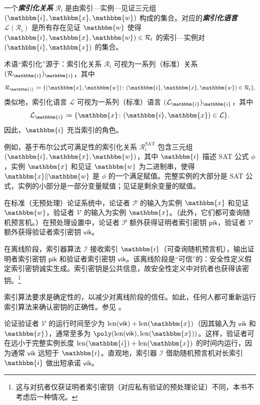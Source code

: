 \documentclass[american,singlepageview]{snargs-book-zh}
\newcommand{\defemph}[1]{\textbf{\emph{#1}}}
\newcommand{\DefineEqual}{\coloneqq}
\newcommand{\concat}{\|}
\newcommand{\BitSize}[1]{\mathrm{len}(#1)}
\newcommand{\Relation}{\mathcal{R}}
\newcommand{\Language}{\mathcal{L}}
\newcommand{\GetLanguage}[1]{\Language(#1)}
\newcommand{\IndexedRelation}{\mathcal{R}_{\mathrm{i}}}
\newcommand{\Index}{\mathbbm{i}}
\newcommand{\Instance}{\mathbbm{x}}
\newcommand{\Witness}{\mathbbm{w}}
\newcommand{\ProtoIndexer}{I}
\newcommand{\ProtoProver}{P}
\newcommand{\ProtoVerifier}{V}
\newcommand{\ARGFormat}[1]{\mathcal{#1}}
\newcommand{\ARGIndexer}{\ARGFormat{\ProtoIndexer}}
\newcommand{\ARGProver}{\ARGFormat{\ProtoProver}}
\newcommand{\ARGVerifier}{\ARGFormat{\ProtoVerifier}}
\newcommand{\ARGpik}{\mathsf{pik}}
\newcommand{\ARGvik}{\mathsf{vik}}
\begin{document}
\begin{definition}
\label{definition:indexed-relation-and-language}
一个\defemph{索引化关系} $\IndexedRelation$ 是由索引—实例—见证三元组 $(\Index,\Instance,\Witness)$ 构成的集合。对应的\defemph{索引化语言} $\GetLanguage{\IndexedRelation}$ 是所有存在见证 $\Witness$ 使得 $(\Index,\Instance,\Witness)\in\IndexedRelation$ 的索引—实例对 $(\Index,\Instance)$ 的集合。
\end{definition}

术语“索引化”源于：索引化关系 $\IndexedRelation$ 可视为一系列（标准）关系 $(\Relation_{\Index})_{\Index}$，其中
\[
  \Relation_{\Index} \DefineEqual \{(\Instance,\Witness)\colon (\Index,\Instance,\Witness)\in\IndexedRelation\},
\]
类似地，索引化语言 $\Language$ 可视为一系列（标准）语言 $(\Language_{\Index})_{\Index}$，其中
\[
  \Language_{\Index} \DefineEqual \{\Instance\colon (\Index,\Instance)\in\Language\}.
\]
因此，$\Index$ 充当索引的角色。

例如，基于布尔公式可满足性的索引化关系 $\IndexedRelation^{\mathrm{SAT}}$ 包含三元组 $(\Index,\Instance,\Witness)$，其中 $\Index$ 描述 SAT 公式 $\phi$，实例 $\Instance$ 和见证 $\Witness$ 为二进制串，使得 $\Instance\concat \Witness$ 是 $\phi$ 的一个满足赋值。完整实例的大部分是 SAT 公式，实例的小部分是一部分变量赋值；见证是剩余变量的赋值。

在标准（无预处理）论证系统中，论证者 $\ARGProver$ 的输入为实例 $\Instance$ 和见证 $\Witness$，验证者 $\ARGVerifier$ 的输入为实例 $\Instance$。（此外，它们都可查询随机预言机。）在预处理设置中，论证者 $\ARGProver$ 额外获得证明者索引密钥 $\ARGpik$，验证者 $\ARGVerifier$ 额外获得验证者索引密钥 $\ARGvik$。

在离线阶段，索引器算法 $\ARGIndexer$ 接收索引 $\Index$（可查询随机预言机），输出证明者索引密钥 $\ARGpik$ 和验证者索引密钥 $\ARGvik$。该离线阶段是“可信”的：安全性定义假定索引密钥诚实生成。索引密钥是公共信息，故安全性定义中对抗者也获得该密钥。\footnote{这与对抗者仅获证明者索引密钥（对应私有验证的预处理论证）不同，本书不考虑后一种情况。}

索引算法要求是确定性的，以减少对离线阶段的信任。如此，任何人都可重新运行索引算法来确认密钥的正确性。参见 。

论证验证者 $\ARGVerifier$ 的运行时间至少为 $\BitSize{\ARGvik} + \BitSize{\Instance}$（因其输入为 $\ARGvik$ 和 $\Instance$），通常至多为 $\poly(\BitSize{\ARGvik},\BitSize{\Instance})$。这样，验证者可在远小于完整实例长度 $\BitSize{\Index} + \BitSize{\Instance}$ 的时间内运行，因为通常 $\ARGvik$ 远短于 $\Index$。直观地，索引器 $\ARGIndexer$ 借助随机预言机对长索引 $\Index$ 做出短承诺 $\ARGvik$。
\end{document}
